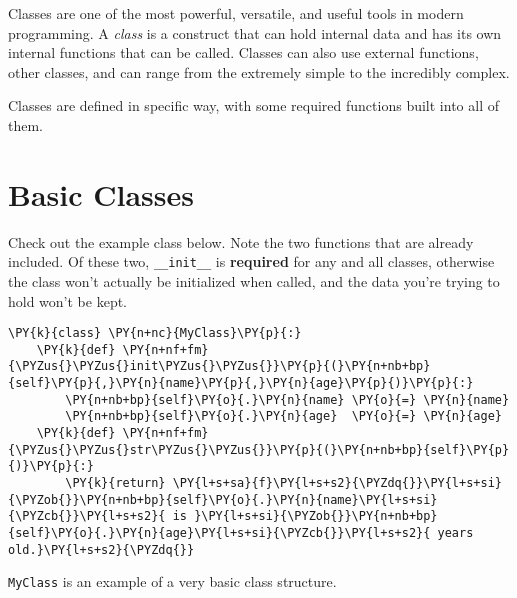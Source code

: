 
Classes are one of the most powerful, versatile, and useful tools in
modern programming. A \emph{class} is a construct that can hold internal
data and has its own internal functions that can be called. Classes can
also use external functions, other classes, and can range from the
extremely simple to the incredibly complex.

Classes are defined in specific way, with some required functions built
into all of them.

\section{Basic Classes}

Check out the example class below. Note the two functions that are
already included. Of these two, \texttt{\_\_init\_\_} is
\textbf{required} for any and all classes, otherwise the class won't
actually be initialized when called, and the data you're trying to hold
won't be kept.

    \begin{tcolorbox}[breakable, size=fbox, boxrule=1pt, pad at break*=1mm,colback=cellbackground, colframe=cellborder]
\begin{Verbatim}[commandchars=\\\{\}]
\PY{k}{class} \PY{n+nc}{MyClass}\PY{p}{:}
    \PY{k}{def} \PY{n+nf+fm}{\PYZus{}\PYZus{}init\PYZus{}\PYZus{}}\PY{p}{(}\PY{n+nb+bp}{self}\PY{p}{,}\PY{n}{name}\PY{p}{,}\PY{n}{age}\PY{p}{)}\PY{p}{:}
        \PY{n+nb+bp}{self}\PY{o}{.}\PY{n}{name} \PY{o}{=} \PY{n}{name}
        \PY{n+nb+bp}{self}\PY{o}{.}\PY{n}{age}  \PY{o}{=} \PY{n}{age}
    \PY{k}{def} \PY{n+nf+fm}{\PYZus{}\PYZus{}str\PYZus{}\PYZus{}}\PY{p}{(}\PY{n+nb+bp}{self}\PY{p}{)}\PY{p}{:}
        \PY{k}{return} \PY{l+s+sa}{f}\PY{l+s+s2}{\PYZdq{}}\PY{l+s+si}{\PYZob{}}\PY{n+nb+bp}{self}\PY{o}{.}\PY{n}{name}\PY{l+s+si}{\PYZcb{}}\PY{l+s+s2}{ is }\PY{l+s+si}{\PYZob{}}\PY{n+nb+bp}{self}\PY{o}{.}\PY{n}{age}\PY{l+s+si}{\PYZcb{}}\PY{l+s+s2}{ years old.}\PY{l+s+s2}{\PYZdq{}}
\end{Verbatim}
\end{tcolorbox}

    \texttt{MyClass} is an example of a very basic class structure.

